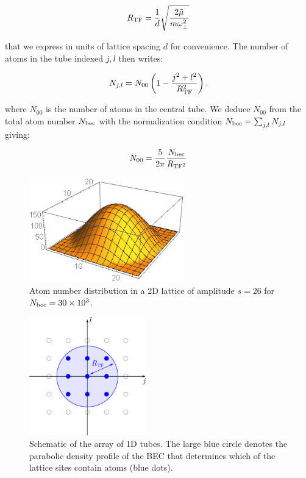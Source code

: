 \begin{equation}
    R_{\rm{TF}} = \frac{1}{d} \sqrt{\frac{2 \tilde{\mu}}{m \omega_{\perp}^2}}
\end{equation}

\noindent that we express in units of lattice spacing $d$ for convenience. The number of atoms in the tube indexed $j,l$ then writes:

\begin{equation}\label{eq:N_per_tube}
    N_{j,l} = N_{00} \left( 1 - \frac{j^2 + l^2}{R_{\rm{TF}}^2} \right) .
\end{equation}

\noindent where $N_{00}$ is the number of atoms in the central tube. We deduce $N_{00}$ from the total atom number $N_{\rm{bec}}$ with the normalization condition $N_{\rm{bec}} = \sum_{j,l} N_{j,l}$ giving:

\begin{equation}
    N_{00} = \frac{5}{2 \pi} \frac{N_{\rm{bec}}}{R_{\rm{TF}^2}}
\end{equation}

\begin{figure}
    \centering
    \includegraphics[width=0.6\textwidth]{Fig/Chapter5/atomic_distrib_2Dlatt.PNG}
    \caption{Atom number distribution in a 2D lattice of amplitude $s=26$ for $N_{\rm{bec}}=30 \times 10^3$.}
    \label{fig:my_label}
\end{figure}

\begin{figure}
    \centering
    \includegraphics[width=0.45\textwidth]{Fig/Chapter5/tubes_occupes.png}
    \caption{Schematic of the array of 1D tubes. The large blue circle denotes the parabolic density profile of the BEC that determines which of the lattice sites contain atoms (blue dots).}
    \label{fig:my_label}
\end{figure}

